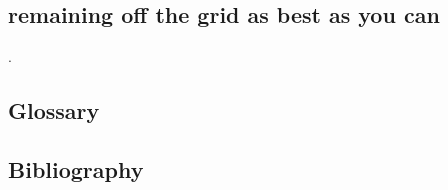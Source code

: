 \documentclass[a4paper,12pt,titlepage]{article}
\begin{document}
\begin{centering}
	\section{remaining off the grid as best as you can}
\end{centering}
.

\newpage
\begin{centering}
	\section{Glossary}
\end{centering}
\printglossaries
\newpage
\begin{centering}
\section{Bibliography}
\end{centering}
\begin{refsection}
\nocite{*}
\printbibliography
\end{refsection}
\end{document}
